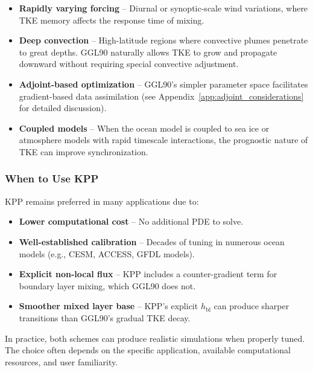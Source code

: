 \documentclass[12pt,letterpaper]{article}
\begin{document}
\begin{itemize}[leftmargin=*]
  \item \textbf{Rapidly varying forcing} -- Diurnal or synoptic-scale wind
        variations, where TKE memory affects the response time of mixing.

  \item \textbf{Deep convection} -- High-latitude regions where convective
        plumes penetrate to great depths. GGL90 naturally allows TKE to grow
        and propagate downward without requiring special convective adjustment.

  \item \textbf{Adjoint-based optimization} -- GGL90's simpler parameter space
        facilitates gradient-based data assimilation (see
        Appendix~\ref{app:adjoint_considerations} for detailed discussion).

  \item \textbf{Coupled models} -- When the ocean model is coupled to sea ice
        or atmosphere models with rapid timescale interactions, the prognostic
        nature of TKE can improve synchronization.
\end{itemize}

\subsubsection{When to Use KPP}

KPP remains preferred in many applications due to:

\begin{itemize}[leftmargin=*]
  \item \textbf{Lower computational cost} -- No additional PDE to solve.

  \item \textbf{Well-established calibration} -- Decades of tuning in numerous
        ocean models (e.g., CESM, ACCESS, GFDL models).

  \item \textbf{Explicit non-local flux} -- KPP includes a counter-gradient
        term for boundary layer mixing, which GGL90 does not.

  \item \textbf{Smoother mixed layer base} -- KPP's explicit $h_{\mathrm{bl}}$
        can produce sharper transitions than GGL90's gradual TKE decay.
\end{itemize}

In practice, both schemes can produce realistic simulations when properly
tuned. The choice often depends on the specific application, available
computational resources, and user familiarity.
\end{document}
